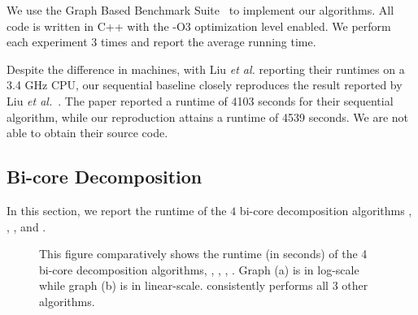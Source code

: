 We use the Graph Based Benchmark Suite~\cite{dhulipala20} to implement our algorithms. All code is written in C++ with the -O$3$ optimization level enabled. We perform each experiment 3 times and report the average running time.

Despite the difference in machines, with Liu \textit{et al.} reporting their runtimes on a 3.4 GHz CPU, our sequential baseline closely reproduces the result reported by Liu \textit{et al.}~\cite{Liu2020Efficient}. The paper reported a runtime of 4103 seconds for their sequential algorithm, while our reproduction attains a runtime of 4539 seconds. We are not able to obtain their source code. 


\subsection{Bi-core Decomposition}

In this section, we report the runtime of the $4$ bi-core decomposition algorithms , , , and . 

\begin{figure}%
    \centering
    \qquad
    \caption{This figure comparatively shows the runtime (in seconds) of the 4 bi-core decomposition algorithms, , , , . Graph (a) is in log-scale while graph (b) is in linear-scale.  consistently performs all 3 other algorithms.}%
    \label{fig:runtimes}%
\end{figure}

